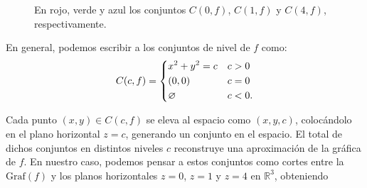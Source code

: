 \begin{example}
\begin{figure}[H]
\begin{center}
\end{center}
  \caption{En rojo,  verde y azul  los conjuntos $C(0,f)$, $C(1,f)$ y $C(4,f)$, respectivamente.}
   \end{figure}

    
    En general, podemos escribir a los conjuntos de nivel de $f$ como: 
       \[
            C(c,f)=
            \begin{dcases}
               x^2+y^2=c  &  c>0 \\
    (0,0)  & c=0\\
    \varnothing  & c<0.\\
            \end{dcases}
        \]

 Cada punto \( (x,y)\in  C(c,f)\)  se eleva al espacio como \((x,y,c)\),  colocándolo en el plano horizontal \(z = c\), generando un conjunto en el espacio.  El total de dichos conjuntos en distintos niveles \(c\) reconstruye una aproximación de la gráfica de $f$. En nuestro caso, podemos pensar a estos conjuntos como cortes entre la $\text{Graf}(f)$  y los planos horizontales $z=0$, $z=1$ y $z=4$ en $\mathbb{R}^{3}$, obteniendo


\end{example}
